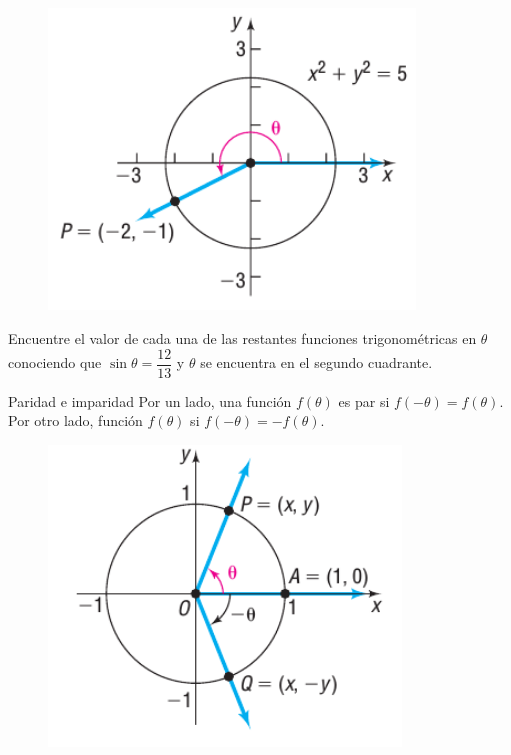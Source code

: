 {}
	\begin{figure}
		\centering
		\includegraphics[height=8cm]{./trig/sull0642.png}
		\label{fig:0642}
	\end{figure}
	

{}
	\begin{problema}
		Encuentre el valor de cada una de las restantes funciones trigonométricas en $\theta$ conociendo que $\sin\theta=\dfrac{12}{13}$ y $\theta$ se encuentra en el segundo cuadrante.
	\end{problema}
	

{Paridad e imparidad}
	Por un lado, una función $f(\theta)$ es par si $f(-\theta)=f(\theta).$  Por otro lado, función $f(\theta)$ si $f(-\theta)=-f(\theta).$

{}
	\begin{figure}
		\centering
		\includegraphics[height=8cm,keepaspectratio=true]{./trig/sull0443.png}
		\label{fig:0643}
	\end{figure}
	


